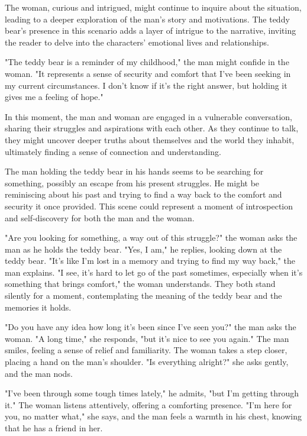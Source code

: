 \documentclass[smalldemyvopaper,11pt,twoside,onecolumn,openright,extrafontsizes]{memoir}
\begin{document}
The woman, curious and intrigued, might continue to inquire about the situation, leading to a deeper exploration of the man's story and motivations. The teddy bear's presence in this scenario adds a layer of intrigue to the narrative, inviting the reader to delve into the characters' emotional lives and relationships.\par
"The teddy bear is a reminder of my childhood," the man might confide in the woman. "It represents a sense of security and comfort that I've been seeking in my current circumstances. I don't know if it's the right answer, but holding it gives me a feeling of hope."\par
In this moment, the man and woman are engaged in a vulnerable conversation, sharing their struggles and aspirations with each other. As they continue to talk, they might uncover deeper truths about themselves and the world they inhabit, ultimately finding a sense of connection and understanding.\par
The man holding the teddy bear in his hands seems to be searching for something, possibly an escape from his present struggles. He might be reminiscing about his past and trying to find a way back to the comfort and security it once provided. This scene could represent a moment of introspection and self-discovery for both the man and the woman.\par
"Are you looking for something, a way out of this struggle?" the woman asks the man as he holds the teddy bear. "Yes, I am," he replies, looking down at the teddy bear. "It's like I'm lost in a memory and trying to find my way back," the man explains. "I see, it's hard to let go of the past sometimes, especially when it's something that brings comfort," the woman understands. They both stand silently for a moment, contemplating the meaning of the teddy bear and the memories it holds.\par
"Do you have any idea how long it's been since I've seen you?" the man asks the woman. "A long time," she responds, "but it's nice to see you again." The man smiles, feeling a sense of relief and familiarity. The woman takes a step closer, placing a hand on the man's shoulder. "Is everything alright?" she asks gently, and the man nods.\par
"I've been through some tough times lately," he admits, "but I'm getting through it." The woman listens attentively, offering a comforting presence. "I'm here for you, no matter what," she says, and the man feels a warmth in his chest, knowing that he has a friend in her.\par
\end{document}
